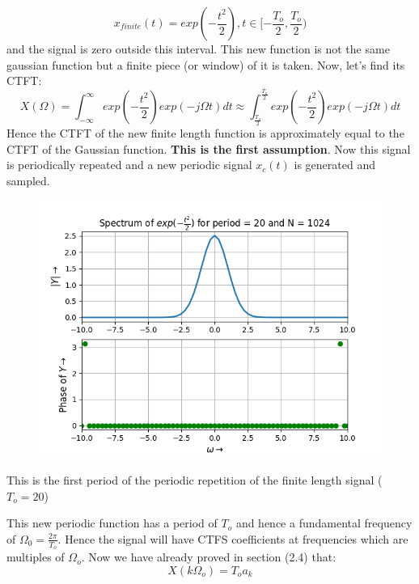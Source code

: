 \documentclass[12pt, a4paper]{article}
\begin{document}
\begin{equation*}
    x_{finite}(t) = exp(-\frac{t^{2}}{2}) , t\in [-\frac{T_{o}}{2},\frac{T_{o}}{2})
\end{equation*}
and the signal is zero outside this interval. This new function is not the same gaussian function but a finite piece (or window) of it is taken. Now, let's find its CTFT:
\begin{equation*}
    X(\Omega) = \int_{-\infty}^{\infty} exp(-\frac{t^{2}}{2})exp(-j\Omega t)dt \approx \int_{\frac{T_{o}}{2}}^{\frac{T_{o}}{2}} exp(-\frac{t^{2}}{2})exp(-j\Omega t)dt
\end{equation*}
Hence the CTFT of the new finite length function is approximately equal to the CTFT of the Gaussian function. \textbf{This is the first assumption}. Now this signal is periodically repeated and a new periodic signal $x_{c}(t)$ is generated and sampled.
\vspace*{-0.5cm}
\begin{figure}[H]
    \centering
    \includegraphics[scale = 0.8]{Figure_9.png}
    \label{fig:sample}
\end{figure}
\begin{center}
    This is the first period of the periodic repetition of the finite length signal ($T_{o} = 20$)
\end{center}
This new periodic function has a period of $T_{o}$ and hence a fundamental frequency of $\Omega_{0} = \frac{2\pi}{T_{o}}$. Hence the signal will have CTFS coefficients at frequencies which are multiples of $\Omega_{o}$. Now we have already proved in section (2.4) that:
\begin{equation*}
    X(k\Omega_{o}) = T_{o}a_{k}
\end{equation*}
\end{document}
